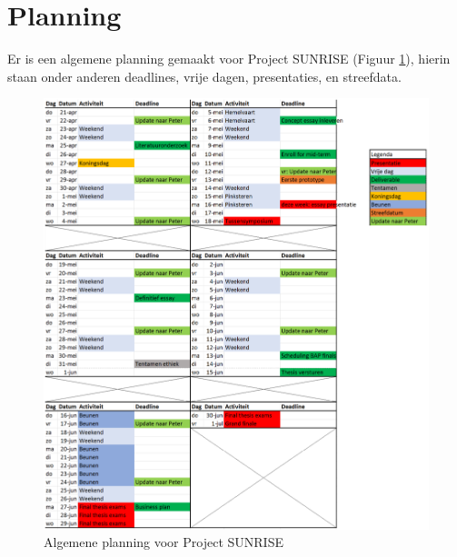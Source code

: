 \section{Planning}
Er is een algemene planning gemaakt voor Project SUNRISE (Figuur \ref{fig:planning}), hierin staan onder anderen deadlines, vrije dagen, presentaties, en streefdata.

\begin{figure}[htbp]
\centering
\includegraphics[width=1.1\textwidth]{Planning_SUNRISE.png}
\caption{Algemene planning voor Project SUNRISE}\label{fig:planning}
\end{figure}